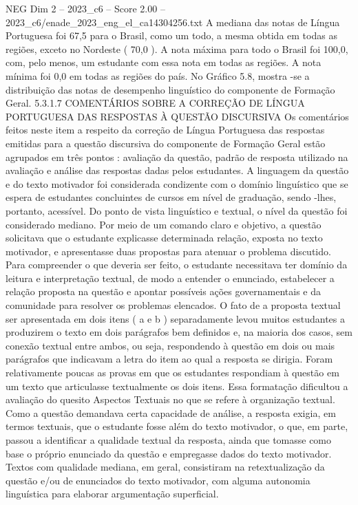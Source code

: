 \begin{textsample}{NEG Dim 2 – 2023\_c6 – Score 2.00 – 2023\_c6/enade\_2023\_eng\_el\_ca14304256.txt}
A mediana das notas de Língua Portuguesa foi 67,5 para o Brasil, como um todo, a mesma obtida em todas as regiões, exceto no Nordeste ( 70,0 ).
A nota máxima para todo o Brasil foi 100,0, com, pelo menos, um estudante com essa nota em todas as regiões.
A nota mínima foi 0,0 em todas as regiões do país.
No Gráfico 5.8, mostra -se a distribuição das notas de desempenho linguístico do componente de Formação Geral. 5.3.1.7 COMENTÁRIOS SOBRE A CORREÇÃO DE LÍNGUA PORTUGUESA DAS RESPOSTAS À QUESTÃO DISCURSIVA Os comentários feitos neste item a respeito da correção de Língua Portuguesa das respostas emitidas para a questão discursiva do componente de Formação Geral estão agrupados em três pontos : avaliação da questão, padrão de resposta utilizado na avaliação e análise das respostas dadas pelos estudantes.
A linguagem da questão e do texto motivador foi considerada condizente com o domínio linguístico que se espera de estudantes concluintes de cursos em nível de graduação, sendo -lhes, portanto, acessível.
Do ponto de vista linguístico e textual, o nível da questão foi considerado mediano.
Por meio de um comando claro e objetivo, a questão solicitava que o estudante explicasse determinada relação, exposta no texto motivador, e apresentasse duas propostas para atenuar o problema discutido.
Para compreender o que deveria ser feito, o estudante necessitava ter domínio da leitura e interpretação textual, de modo a entender o enunciado, estabelecer a relação proposta na questão e apontar possíveis ações governamentais e da comunidade para resolver os problemas elencados.
O fato de a proposta textual ser apresentada em dois itens ( a e b ) separadamente levou muitos estudantes a produzirem o texto em dois parágrafos bem definidos e, na maioria dos casos, sem conexão textual entre ambos, ou seja, respondendo à questão em dois ou mais parágrafos que indicavam a letra do item ao qual a resposta se dirigia.
Foram relativamente poucas as provas em que os estudantes respondiam à questão em um texto que articulasse textualmente os dois itens.
Essa formatação dificultou a avaliação do quesito Aspectos Textuais no que se refere à organização textual.
Como a questão demandava certa capacidade de análise, a resposta exigia, em termos textuais, que o estudante fosse além do texto motivador, o que, em parte, passou a identificar a qualidade textual da resposta, ainda que tomasse como base o próprio enunciado da questão e empregasse dados do texto motivador.
Textos com qualidade mediana, em geral, consistiram na retextualização da questão e/ou de enunciados do texto motivador, com alguma autonomia linguística para elaborar argumentação superficial.

\end{textsample}
